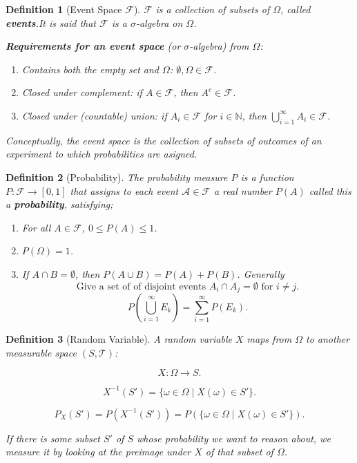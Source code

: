 \documentclass[10pt, oneside]{article}
\newenvironment{definitionbox}[1][]{\begin{defbox}\begin{defn}[#1]}{\end{defn}\end{defbox}}
\numberwithin{equation}{section}
\newtheorem{defn}{Definition}[section]
\begin{document}
\begin{definitionbox}[Event Space $\mathcal{F}$]
\(\mathcal{F}\) is a collection of subsets of $\Omega$, called \textbf{events}.It is said that \(\mathcal{F}\) is a \(\sigma\)-algebra on $\Omega$. 

\textbf{Requirements for an event space} (or $\sigma$-algebra) from $\Omega$:
\begin{enumerate}[label=(\roman*)]
    \item Contains both the empty set and $\Omega$: $\emptyset, \Omega \in \mathcal{F}$.
    \item Closed under complement: if $A \in \mathcal{F}$, then $A^c \in \mathcal{F}$.
    \item Closed under (countable) union: if $A_i \in \mathcal{F}$ for $i \in \mathbb{N}$, then \(\displaystyle \bigcup_{i=1}^{\infty} A_i \in \mathcal{F}\).
\end{enumerate}

Conceptually, the event space is the collection of subsets of outcomes of an experiment to which probabilities are asigned.
    
\end{definitionbox}


\begin{definitionbox}[Probability]
The probability measure $P$ is a function $P:\mathcal{F} \rightarrow [0,1]$ that assigns to each event $\mathcal{A} \in \mathcal{F}$ a real number $P(A)$ called this a \textbf{probability}, satisfying;
\begin{enumerate}[label=(\alph*)]
    \item For all $A \in \mathcal{F}$, $0 \le P(A) \le 1$.
    \item $P(\Omega)=1$.
    \item If $A \cap B = \emptyset$, then $P(A \cup B) = P(A) + P(B)$. Generally
    \[
    \text{Give a set of of disjoint events } A_i \cap A_j = \emptyset \text{ for } i \neq j. 
    \]
    \[
    P\!\left( \bigcup_{i=1}^{\infty} E_k \right) = \sum_{i=1}^{\infty} P(E_k).
    \]
\end{enumerate}
    
\end{definitionbox}

\begin{definitionbox}[Random Variable]
A random variable $X$ maps from $\Omega$ to another measurable space $(S, \mathcal{T})$:

\[
X: \Omega \to S.
\]

\[
X^{-1}(S') = \{\omega \in \Omega \mid X(\omega) \in S'\}.
\]

\[
P_X(S') = P(X^{-1}(S')) = P(\{\omega \in \Omega \mid X(\omega) \in S'\}).
\]

If there is some subset $S'$ of $S$ whose probability we want to reason about,  
we measure it by looking at the preimage under $X$ of that subset of $\Omega$.

    
\end{definitionbox}
\end{document}
